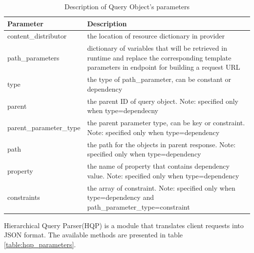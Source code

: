 \begin{center}
	\begin{table}
	  	\caption{Description of Query Object's parameters}
	 	\label{table:query_obj_desrc}
	  	\begin{tabular}{|l|p{4in}|}
	    \hline
	    Parameter & Description  \\ \hline
	    content\_distributor & the location of resource dictionary in provider  \\ \hline
	    path\_parameters & dictionary of variables that will be retrieved in runtime and replace the corresponding template parameters in endpoint for building a request URL  \\ \hline
	    type & the type of path\_parameter, can be constant or dependency  \\ \hline
	    parent & the parent ID of query object. Note: specified only when type=dependecny \\ \hline
	    parent\_parameter\_type & the parent parameter type, can be key or constraint. Note: specified only when type=dependency \\ \hline
	    path & the path for the objects in parent response. Note: specified only when type=dependency \\ \hline
	    property & the name of property that contains dependency value. Note: specified only when type=dependency \\ \hline
	    constraints & the array of constraint. Note: specified only when type=dependency  and path\_parameter\_type=constraint\\ \hline
	    \hline
		\end{tabular}
  	\end{table}
\end{center}


Hierarchical Query Parser(HQP) is a module that translates client requests into JSON format. The available methods are presented in table \ref{table:hqp_parameters}.


